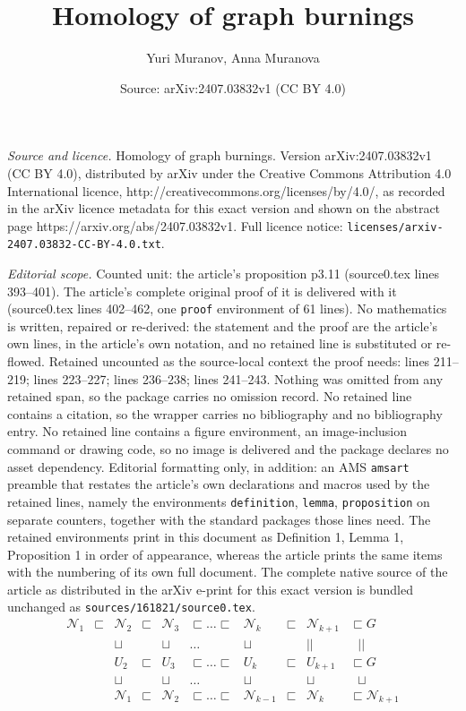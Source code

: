 \documentclass[10pt,a4paper]{amsart}
\title{Homology of graph burnings}
\author{Yuri Muranov, Anna Muranova}
\date{Source: arXiv:2407.03832v1 (CC BY 4.0)}
\begin{document}
\maketitle

\noindent\emph{Source and licence.} Homology of graph burnings. Version arXiv:2407.03832v1 (CC BY 4.0), distributed by arXiv under the Creative Commons Attribution 4.0 International licence, http://creativecommons.org/licenses/by/4.0/, as recorded in the arXiv licence metadata for this exact version and shown on the abstract page https://arxiv.org/abs/2407.03832v1. Full licence notice: \texttt{licenses/arxiv-2407.03832-CC-BY-4.0.txt}.\par\smallskip

\noindent\textit{Editorial scope.} Counted unit: the article's proposition p3.11 (source0.tex lines 393--401). The article's complete original proof of it is delivered with it (source0.tex lines 402--462, one \texttt{proof} environment of 61 lines). No mathematics is written, repaired or re-derived: the statement and the proof are the article's own lines, in the article's own notation, and no retained line is substituted or re-flowed.  Retained uncounted as the source-local context the proof needs: lines 211--219; lines 223--227; lines 236--238; lines 241--243.  Nothing was omitted from any retained span, so the package carries no omission record.  No retained line contains a citation, so the wrapper carries no bibliography and no bibliography entry.  No retained line contains a figure environment, an image-inclusion command or drawing code, so no image is delivered and the package declares no asset dependency.  Editorial formatting only, in addition: an AMS \texttt{amsart} preamble that restates the article's own declarations and macros used by the retained lines, namely the environments \texttt{definition}, \texttt{lemma}, \texttt{proposition} on separate counters, together with the standard packages those lines need.  The retained environments print in this document as Definition 1, Lemma 1, Proposition 1 in order of appearance, whereas the article prints the same items with the numbering of its own full document.  The complete native source of the article as distributed in the arXiv e-print for this exact version is bundled unchanged as \texttt{sources/161821/source0.tex}.
\begin{equation}\label{3.3}
\begin{matrix}
\mathcal N_1 &\sqsubset & \mathcal N_2& \sqsubset &\mathcal N_3&\sqsubset \dots \sqsubset  &\mathcal N_k&\sqsubset&\mathcal N_{k+1}&\sqsubset  G\\
 && \sqcup&  &\sqcup &\dots & \sqcup&&||&\  \ \ || \\
                  &  &U_2&\sqsubset& U_3&\sqsubset\dots \sqsubset  &U_k&\sqsubset&U_{k+1}&\sqsubset  G\\
&& \sqcup&  &\sqcup &\dots & \sqcup&&\sqcup&\ \ \  \sqcup \\
                  &  &\mathcal N_1&\sqsubset& \mathcal N_2&\sqsubset\dots \sqsubset  &\mathcal N_{k-1}&\sqsubset&\mathcal N_{k}&\sqsubset  \mathcal N_{k+1}\\
\end{matrix}
\end{equation}
\end{document}

